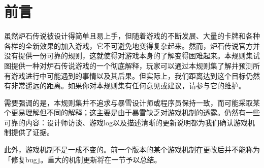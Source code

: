 \chapter{前言}

虽然炉石传说被设计得简单且易上手，但随着游戏的不断发展、大量的卡牌和各种各样的全新效果的加入游戏，它不可避免地变得复杂起来。然而，炉石传说官方并没有提供一份可靠的规则，这就使得对游戏本身的了解变得困难起来。本规则集试图提供一种对炉石传说游戏的一个彻底解释，玩家可以通过本规则集了解并预测所有游戏进行中可能遇到的事情以及其后果。但实际上，我们距离达到这个目标仍然有非常遥远的距离。如果你对本规则集有任何意见或建议，请参与它的维护。

需要强调的是，本规则集并不追求与暴雪设计师或程序员保持一致，而可能采取某个更易理解但不同的解释；这主要是由于暴雪缺乏对游戏机制的透露。仍然有一些可靠的内容：设计师访谈、游戏log以及描述清晰的更新说明都为我们确认游戏机制提供了证据。

此外，游戏机制不是一成不变的。前一个版本的某个游戏机制在更改后并不能称为「修复bug」。重大的机制更新将在一节予以总结。
